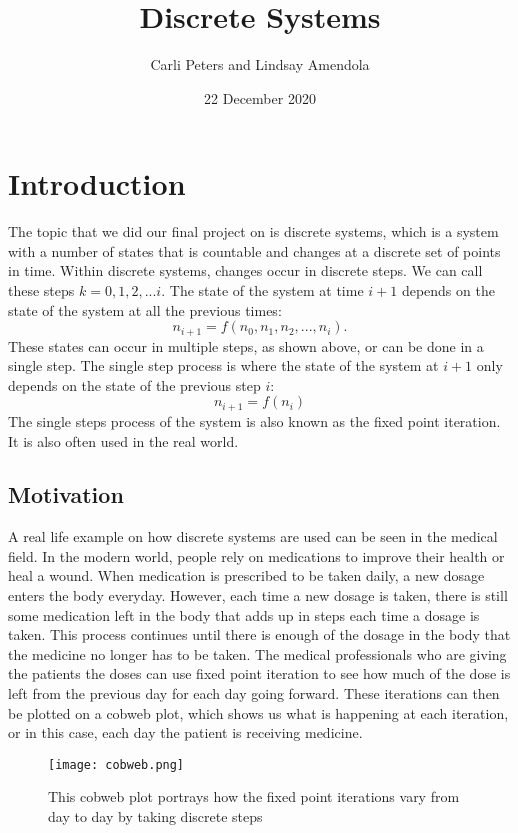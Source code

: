 \documentclass{article}
\title{Discrete Systems}
\author{Carli Peters and Lindsay Amendola}
\date{22 December 2020}
\begin{document}
\maketitle

\section{Introduction}
The topic that we did our final project on is discrete systems, which is a system with a number of states that is countable and changes at a discrete set of points in time. Within discrete systems, changes occur in discrete steps. We can call these steps $k = 0,1,2,...i.$ The state of the system at time $i+1$ depends on the state of the system at all the previous times: \cite{shapiro2018scientific}
$$
n_{i+1}=f(n_0,n_1,n_2,...,n_i).
$$
These states can occur in multiple steps, as shown above, or can be done in a single step. The single step process is where the state of the system at $i+1$ only depends on the state of the previous step $i$:
$$
n_{i+1}=f(n_i)
$$
The single steps process of the system is also known as the fixed point iteration. It is also often used in the real world. \cite{shapiro2018scientific}
\subsection{Motivation}
A real life example on how discrete systems are used can be seen in the medical field. In the modern world, people rely on medications to improve their health or heal a wound. When medication is prescribed to be taken daily, a new dosage enters the body everyday. However, each time a new dosage is taken, there is still some medication left in the body that adds up in steps each time a dosage is taken. This process continues until there is enough of the dosage in the body that the medicine no longer has to be taken. The medical professionals who are giving the patients the doses can use fixed point iteration to see how much of the dose is left from the previous day for each day going forward. These iterations can then be plotted on a cobweb plot, which shows us what is happening at each iteration, or in this case, each day the patient is receiving medicine. 
\begin{figure}
    \centering
    \texttt{[image: cobweb.png]}
    \caption{This cobweb plot portrays how the fixed point iterations vary from day to day by taking discrete steps}
    \label{fig:Cobweb Plot for Medication Use}
\end{figure}
\end{document}
